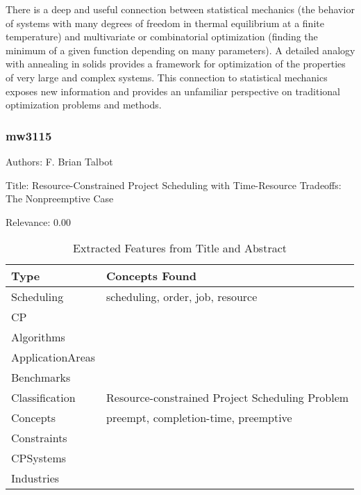  There is a deep and useful connection between statistical mechanics (the behavior of systems with many degrees of freedom in thermal equilibrium at a finite temperature) and multivariate or combinatorial optimization (finding the minimum of a given function depending on many parameters). A detailed analogy with annealing in solids provides a framework for optimization of the properties of very large and complex systems. This connection to statistical mechanics exposes new information and provides an unfamiliar perspective on traditional optimization problems and methods. 

\subsubsection{mw3115}
\label{mw:mw3115}

Authors: F. Brian Talbot

Title: Resource-Constrained Project Scheduling with Time-Resource Tradeoffs: The Nonpreemptive Case

Relevance:  0.00

{\scriptsize
\begin{longtable}{p{2cm}p{20cm}}
\caption{Extracted Features from Title and Abstract}\\ \toprule
Type & Concepts Found\\ \midrule
\endhead
\bottomrule
\endfoot
Scheduling & scheduling, order, job, resource\\ 
CP & \\ 
Algorithms & \\ 
ApplicationAreas & \\ 
Benchmarks & \\ 
Classification & Resource-constrained Project Scheduling Problem\\ 
Concepts & preempt, completion-time, preemptive\\ 
Constraints & \\ 
CPSystems & \\ 
Industries & \\ 
\end{longtable}
}


